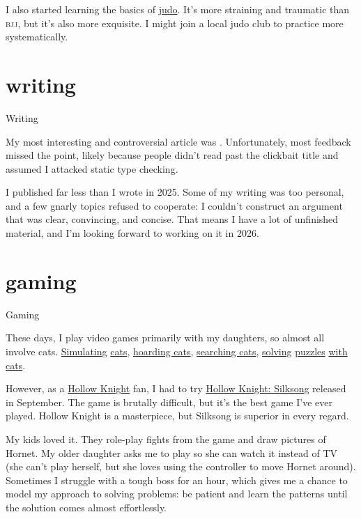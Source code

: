 \documentclass{article}
\begin{document}
I also started learning the basics of \href{https://en.wikipedia.org/wiki/Judo}{judo}.
It's more straining and traumatic than \textsc{bjj},
but it's also more exquisite.
I might join a local judo club
to practice more systematically.

\section{writing}{Writing}

My most interesting and controversial article was
.
Unfortunately, most feedback missed the point,
likely because people didn't read past the clickbait title and assumed
I attacked static type checking.

I published far less than I wrote in 2025.
Some of my writing was too personal,
and a few gnarly topics refused to cooperate:
I couldn't construct an argument that was clear, convincing, and concise.
That means I have a lot of unfinished material,
and I'm looking forward to working on it in 2026.

\section{gaming}{Gaming}

These days, I play video games primarily with my daughters,
so almost all involve cats.
\href{https://store.steampowered.com/app/1177980/Little_Kitty_Big_City/}{Simulating} \href{https://store.steampowered.com/app/1332010/Stray/}{cats}, \href{https://store.steampowered.com/app/634160/Cattails__Become_a_Cat/}{hoarding cats}, \href{https://store.steampowered.com/app/2377970/Cats_Hidden_Around_the_World/}{searching cats}, \href{https://store.steampowered.com/app/1608230/Planet_of_Lana/}{solving} \href{https://store.steampowered.com/app/2781210/CAT__ONION/}{puzzles} \href{https://store.steampowered.com/app/1150950/Timelie/}{with cats}.

However, as a \href{https://www.hollowknight.com/}{Hollow Knight} fan,
I had to try \href{https://hollowknightsilksong.com/}{Hollow Knight: Silksong} released in September.
The game is brutally difficult,
but it's the best game I've ever played.
Hollow Knight is a masterpiece,
but Silksong is superior in every regard.

My kids loved it.
They role-play fights from the game and draw pictures of Hornet.
My older daughter asks me to play so she can watch it instead of TV
(she can't play herself,
but she loves using the controller to move Hornet around).
Sometimes I struggle with a tough boss for an hour,
which gives me a chance to model my approach to solving problems:
be patient and learn the patterns until the solution comes almost effortlessly.
\end{document}
